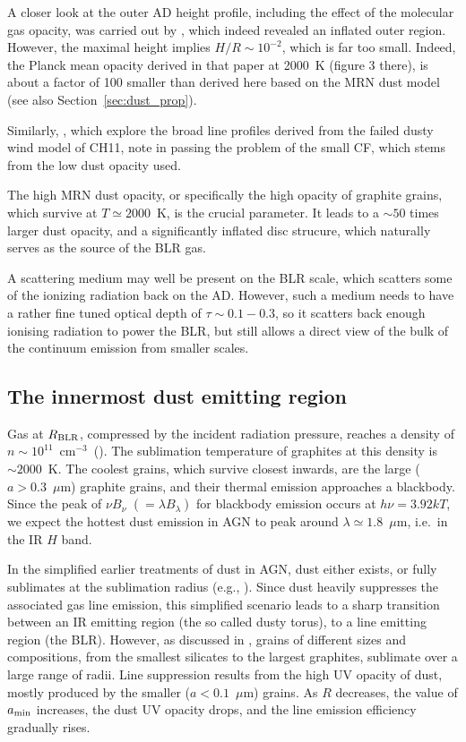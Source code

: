 \documentclass[a4paper,fleqn,usenatbib]{mnras}
\newcommand{\cmt}{cm$^{-3}$}
\newcommand{\mic}{\mbox{$\mu$m}}
\begin{document}
A closer look at the outer AD height profile, including the effect of the molecular gas opacity,
was carried out by \citet{Hure94}, which indeed revealed an inflated outer region. However, the
maximal height implies $H/R\sim 10^{-2}$, which is far too small. Indeed, the Planck mean 
opacity derived in that paper at 2000~K (figure 3 there), is about a factor of 100 smaller than
derived here based on the MRN dust model (see also Section~\ref{sec:dust_prop}).  

Similarly, \citet{Czerny17}, which explore the broad line profiles derived from the 
failed dusty wind model of CH11, note in passing the problem of the small CF,
which stems from the low dust opacity used. 

The high MRN dust opacity, or specifically the high opacity of graphite grains, which
survive at $T\simeq 2000$~K, is the crucial parameter. It leads to a $\sim 50$ times
larger dust opacity, and a significantly
inflated disc strucure, which naturally serves as the source of the BLR gas. 

A scattering medium may well be present on the BLR scale, which scatters some of the ionizing
radiation back on the AD. However, such a medium needs to have a rather fine tuned optical depth of
$\tau\sim 0.1-0.3$, so it scatters back enough ionising radiation to power the BLR, but still allows 
a direct view of the bulk of the continuum emission from smaller scales.



\subsection{The innermost dust emitting region}

Gas at $R_{\rm BLR}$, compressed by the incident radiation pressure, reaches a density of 
$n\sim 10^{11}$~\cmt\ (\citealt{paperII}). The sublimation temperature of graphites at this
density is $\sim 2000$~K. The coolest grains, which survive closest inwards, are the large 
($a>0.3$~\mic) graphite grains, and their thermal emission approaches a blackbody. 
Since the peak of $\nu B_{\nu}$ $(=\lambda B_{\lambda})$ for blackbody emission occurs 
at $h\nu=3.92kT$, we expect the hottest dust emission in AGN
to peak around $\lambda\simeq 1.8$~\mic, i.e.\ in the IR $H$ band. 

In the simplified earlier treatments of dust in AGN, dust either exists, or fully sublimates at
the sublimation radius (e.g., \citealt{Barvainis87, NetzerLaor93, Ferguson97,paperII}). Since
dust heavily suppresses the associated gas line emission, this simplified scenario leads to a sharp transition
between an IR emitting region (the so called dusty torus), to a line emitting region (the BLR).  
However, as discussed in \citet{LaorDraine93},
grains of different sizes and compositions, from the smallest silicates to the largest graphites,
sublimate over a large range of radii. Line suppression results from the high UV opacity of dust, 
mostly produced by the smaller ($a<0.1$~\mic) grains. As $R$ decreases, the value of $a_{\rm min}$ increases,
the dust UV opacity drops, and the line emission efficiency gradually rises. 
\end{document}
